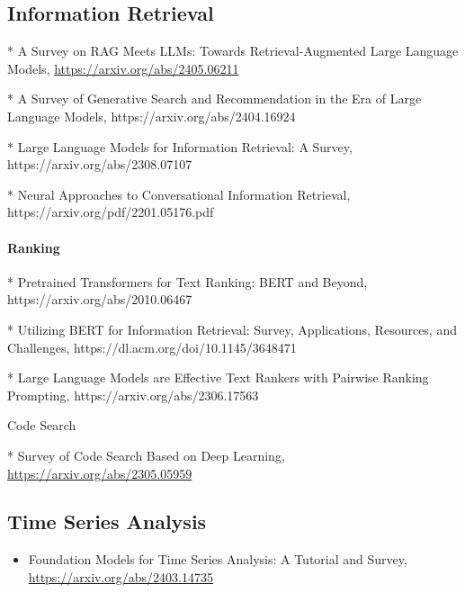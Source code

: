 \subsection{Information Retrieval}

* A Survey on RAG Meets LLMs: Towards Retrieval-Augmented Large Language Models, \url{https://arxiv.org/abs/2405.06211}

* A Survey of Generative Search and Recommendation in the Era of Large Language Models,
https://arxiv.org/abs/2404.16924

* Large Language Models for Information Retrieval: A Survey, https://arxiv.org/abs/2308.07107

* Neural Approaches to Conversational Information Retrieval, https://arxiv.org/pdf/2201.05176.pdf

\paragraph{Ranking}

* Pretrained Transformers for Text Ranking: BERT and Beyond, https://arxiv.org/abs/2010.06467

* Utilizing BERT for Information Retrieval: Survey, Applications, Resources, and Challenges, https://dl.acm.org/doi/10.1145/3648471

* Large Language Models are Effective Text Rankers with Pairwise Ranking Prompting, https://arxiv.org/abs/2306.17563

Code Search

* Survey of Code Search Based on Deep Learning, \url{https://arxiv.org/abs/2305.05959}

\subsection{Time Series Analysis}

\begin{itemize}
\item Foundation Models for Time Series Analysis: A Tutorial and Survey, \url{https://arxiv.org/abs/2403.14735}
\end{itemize}
